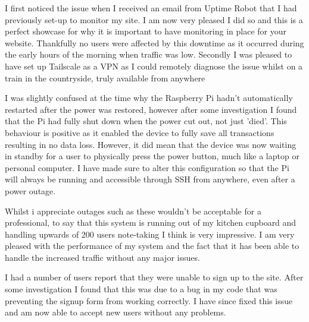 I first noticed the issue when I received an email from Uptime Robot that I had previously set-up to monitor my site. I am now very pleased I did so and this is a perfect showcase for why it is important to have monitoring in place for your website. Thankfully no users were affected by this downtime as it occurred during the early hours of the morning when traffic was low. Secondly I was pleased to have set up Tailscale as a VPN as I could remotely diagnose the issue whilst on a train in the countryside, truly available from anywhere

I was slightly confused at the time why the Raspberry Pi hadn't automatically restarted after the power was restored, however after some investigation I found that the Pi had fully shut down when the power cut out, not just 'died'. This behaviour is positive as it enabled the device to fully save all transactions resulting in no data loss. However, it did mean that the device was now waiting in standby for a user to physically press the power button, much like a laptop or personal computer. I have made sure to alter this configuration so that the Pi will always be running and accessible through SSH from anywhere, even after a power outage.

Whilst i appreciate outages such as these wouldn't be acceptable for a professional, to say that this system is running out of my kitchen cupboard and handling upwards of 200 users note-taking I think is very impressive. I am very pleased with the performance of my system and the fact that it has been able to handle the increased traffic without any major issues. 


I had a number of users report that they were unable to sign up to the site. After some investigation I found that this was due to a bug in my code that was preventing the signup form from working correctly. I have since fixed this issue and am now able to accept new users without any problems.